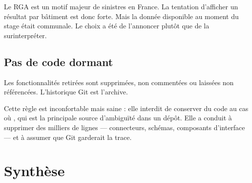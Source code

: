 Le RGA est un motif majeur de sinistres en France. La tentation d'afficher un
résultat par bâtiment est donc forte. Mais la donnée disponible au moment du
stage était communale. Le choix a été de l'annoncer plutôt que de la surinterpréter.

\subsection{Pas de code dormant}

\begin{invariant}
Les fonctionnalités retirées sont supprimées, non commentées ou laissées non
référencées. L'historique Git est l'archive.
\end{invariant}

Cette règle est inconfortable mais saine : elle interdit de conserver du code
\og au cas où \fg, qui est la principale source d'ambiguïté dans un dépôt. Elle
a conduit à supprimer des milliers de lignes — connecteurs, schémas, composants
d'interface — et à assumer que Git garderait la trace.

\section{Synthèse}

